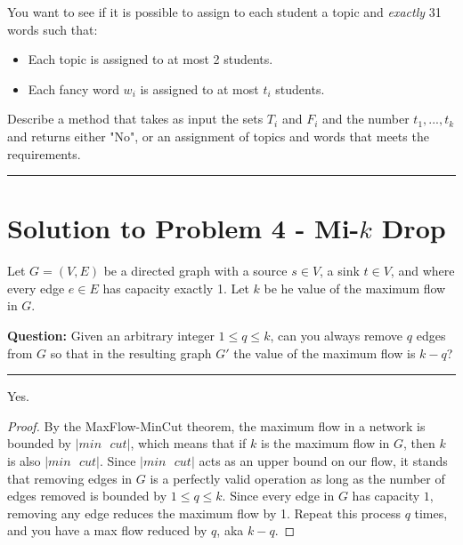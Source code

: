 \documentclass[11pt]{article}
\begin{document}
You want to see if it is possible to assign to each student a topic and \textit{exactly} 31 words such that:
\begin{itemize}
	\item Each topic is assigned to at most 2 students.
	\item Each fancy word $w_i$ is assigned to at most $t_i$ students.
\end{itemize}

Describe a method that takes as input the sets $T_i$ and $F_i$ and the number $t_1, ..., t_k$ and returns either "No", or an assignment of topics and words that meets the requirements.

\noindent\rule{17cm}{0.4pt}

\pagebreak

\section*{Solution to Problem 4 - Mi-$k$ Drop}

Let $G = (V,E)$ be a directed graph with a source $s \in V$, a sink $t \in V$, and where every edge $e \in E$ has capacity exactly 1. Let $k$ be he value of the maximum flow in $G$.

\textbf{Question:} Given an arbitrary integer $1 \leq q \leq k$, can you always remove $q$ edges from $G$ so that in the resulting graph $G'$ the value of the maximum flow is $k-q$?

\noindent\rule{17cm}{0.4pt}

Yes.

\begin{proof}
By the MaxFlow-MinCut theorem, the maximum flow in a network is bounded by $|min\text{ }cut|$, which means that if $k$ is the maximum flow in $G$, then $k$ is also $|min\text{ }cut|$. Since $|min\text{ }cut|$ acts as an upper bound on our flow, it stands that removing edges in $G$ is a perfectly valid operation as long as the number of edges removed is bounded by $1 \leq q \leq k$. Since every edge in $G$ has capacity $1$, removing any edge  reduces the maximum flow by 1. Repeat this process $q$ times, and you have a max flow reduced by $q$, aka $k-q$.
\end{proof} 
\end{document}
